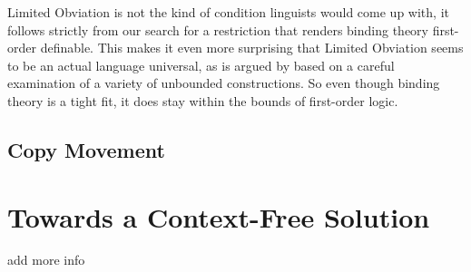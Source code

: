 Limited Obviation is not the kind of condition linguists would come up with, it follows strictly from our search for a restriction that renders binding theory first-order definable.
This makes it even more surprising that Limited Obviation seems to be an actual language universal, as is argued by \citet{GrafAbner12TAG} based on a careful examination of a variety of unbounded constructions.
So even though binding theory is a tight fit, it does stay within the bounds of first-order logic.

\subsection{Copy Movement}

\section{Towards a Context-Free Solution}

\begin{literature}
add more info
\end{literature}
